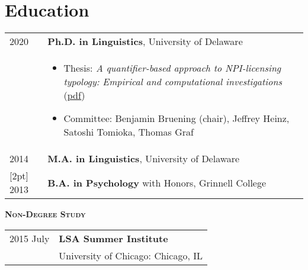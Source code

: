 \documentclass[11pt]{article} %
\begin{document}
\section*{Education}

\begin{tabular}{p{0.75in} p{5.5in}}
2020 & {\bf Ph.D. in Linguistics}, University of Delaware \\
& \begin{itemize}
 \item {Thesis: \textit{A quantifier-based approach to NPI-licensing typology: Empirical and computational investigations}} (\href{https://maihavu.com/dissertation/vu-dissertation-2020-04-16.pdf}{pdf})
 \item Committee: Benjamin Bruening (chair), Jeffrey Heinz, Satoshi Tomioka, Thomas Graf
 \end{itemize} \\ %
[2pt]
2014 & \textbf{M.A. in Linguistics}, University of Delaware \\ 
 [2pt]
2013 & \textbf{B.A. in Psychology} with Honors, Grinnell College \\
\end{tabular}
\vspace{5pt}

\textsc{\textbf{Non-Degree Study}}

\vspace{5pt}

\begin{tabular}{p{0.75in} l}
2015 July & \textbf{LSA Summer Institute} \\
	& University of Chicago: Chicago, IL \\ 
\end{tabular}
\renewcommand{\refname}{Presentations}
\end{document}
